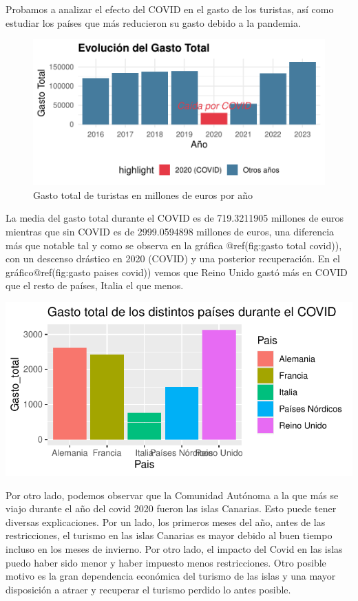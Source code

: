 \documentclass[data,article,submit,moreauthors,pdftex]{Definitions/mdpi}
\begin{document}
Probamos a analizar el efecto del COVID en el gasto de los turistas, así
como estudiar los países que más reducieron su gasto debido a la
pandemia.

\begin{figure}[H]
\includegraphics{ProyectoAED2024_Rmd_files/figure-latex/gasto total covid-1} \caption{Gasto total de turistas en millones de euros por año}\label{fig:gasto total covid}
\end{figure}

La media del gasto total durante el COVID es de 719.3211905 millones de
euros mientras que sin COVID es de 2999.0594898 millones de euros, una
diferencia más que notable tal y como se observa en la gráfica
@ref(fig:gasto total covid)), con un descenso drástico en 2020 (COVID) y
una posterior recuperación. En el gráfico@ref(fig:gasto paises covid))
vemos que Reino Unido gastó más en COVID que el resto de países, Italia
el que menos.

\includegraphics{ProyectoAED2024_Rmd_files/figure-latex/gasto paises covid-1}

Por otro lado, podemos observar que la Comunidad Autónoma a la que más
se viajo durante el año del covid 2020 fueron las islas Canarias. Esto
puede tener diversas explicaciones. Por un lado, los primeros meses del
año, antes de las restricciones, el turismo en las islas Canarias es
mayor debido al buen tiempo incluso en los meses de invierno. Por otro
lado, el impacto del Covid en las islas puedo haber sido menor y haber
impuesto menos restricciones. Otro posible motivo es la gran dependencia
económica del turismo de las islas y una mayor disposición a atraer y
recuperar el turismo perdido lo antes posible.
\end{document}
